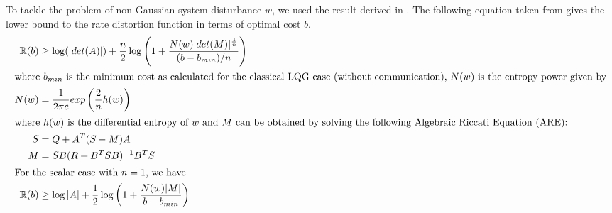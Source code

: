 \documentclass[12pt]{caltech_thesis_finalreport}
\begin{document}
%					  
		To tackle the problem of non-Gaussian system disturbance $w$, we used the result derived in \cite{victoria}. The following equation taken from \cite{victoria} gives the lower bound to the rate distortion function in terms of optimal cost $b$. 
	\begin{align}
	\label{lowerbound}
	\mathbb{R}(b) &\geq \log(|det(A)|) + \frac{n}{2} \log \left( 1 + \frac{N(w)|det(M)|^{\frac{1}{n}}}{(b-b_{min})/n}\right) \\	
	\intertext{where $b_{min}$ is the minimum cost as calculated for the classical LQG case (without communication), $N(w)$ is the entropy power given by}	
	N(w) &= \frac{1}{2 \pi e} exp \left( \frac{2}{n} h(w) \right)\\	
	\intertext{where $h(w)$ is the differential entropy of $w$ and $M$ can be obtained by solving the following Algebraic Riccati Equation (ARE):}
	S &= Q + A^{T}(S - M)A\\
	M &= SB(R + B^{T}SB)^{-1}B^{T}S\\
	\intertext{For the scalar case with $n = 1$, we have}
	\mathbb{R}(b) &\geq \log|A| + \frac{1}{2} \log \left( 1 + \frac{N(w)|M|}{b-b_{min}}\right)
	\end{align}\\		
\end{document}

